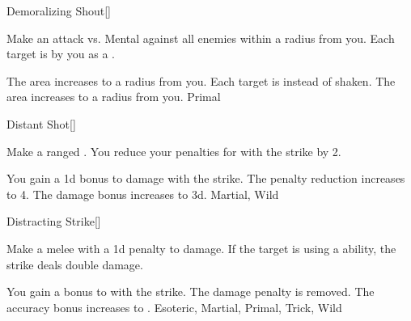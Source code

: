 \lowercase{\hypertarget{maneuver:Demoralizing Shout}{}}\label{maneuver:Demoralizing Shout}
\hypertarget{maneuver:Demoralizing Shout}{}
\begin{freeability}[Rank 1]{Demoralizing Shout}[]

Make an attack vs. Mental against all enemies within a \areasmall radius from you.
\hit Each target is  by you as a .

\rankline
{} The area increases to a \areamed radius from you.
 Each target is  instead of shaken.
 The area increases to a \areahuge radius from you.
 Primal
\end{freeability}
\vspace{0.25em}



\lowercase{\hypertarget{maneuver:Distant Shot}{}}\label{maneuver:Distant Shot}
\hypertarget{maneuver:Distant Shot}{}
\begin{freeability}[Rank 1]{Distant Shot}[]

Make a ranged .
You reduce your penalties for  with the strike by 2.

\rankline
{} You gain a \plus1d bonus to damage with the strike.
 The penalty reduction increases to 4.
 The damage bonus increases to \plus3d.
 Martial, Wild
\end{freeability}
\vspace{0.25em}



\lowercase{\hypertarget{maneuver:Distracting Strike}{}}\label{maneuver:Distracting Strike}
\hypertarget{maneuver:Distracting Strike}{}
\begin{freeability}[Rank 1]{Distracting Strike}[]

Make a melee  with a \minus1d penalty to damage.
If the target is using a  ability, the strike deals double damage.

\rankline
{} You gain a  bonus to  with the strike.
 The damage penalty is removed.
 The accuracy bonus increases to .
 Esoteric, Martial, Primal, Trick, Wild
\end{freeability}
\vspace{0.25em}



